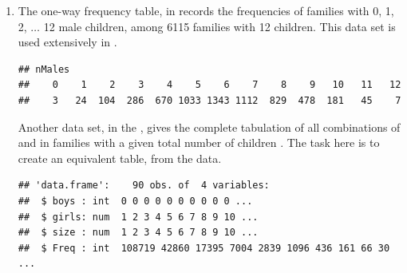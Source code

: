 \documentclass[11pt]{book}
\renewenvironment{knitrout}{\small\renewcommand{\baselinestretch}{.85}}{} %
\begin{document}
\begin{enumerate}
\item The one-way frequency table,  in  records the frequencies
of families with 0, 1, 2, $\dots$ 12 male children, among 6115 families with 12
children.  This data set is used extensively in .
\begin{knitrout}
\color{fgcolor}\begin{kframe}
\begin{alltt}
 \hlstd{=}\hlstd{)}
\end{alltt}
\begin{verbatim}
## nMales
##    0    1    2    3    4    5    6    7    8    9   10   11   12 
##    3   24  104  286  670 1033 1343 1112  829  478  181   45    7
\end{verbatim}
\end{kframe}
\end{knitrout}
Another data set,  in the , gives the complete
tabulation of all combinations of  and  in families with
a given total number of children .  The task here is to create an
equivalent table,  from the  data.
\begin{knitrout}
\color{fgcolor}\begin{kframe}
\begin{alltt}
 \hlstd{=}\hlstd{)}
\end{alltt}
\begin{verbatim}
## 'data.frame':	90 obs. of  4 variables:
##  $ boys : int  0 0 0 0 0 0 0 0 0 0 ...
##  $ girls: num  1 2 3 4 5 6 7 8 9 10 ...
##  $ size : num  1 2 3 4 5 6 7 8 9 10 ...
##  $ Freq : int  108719 42860 17395 7004 2839 1096 436 161 66 30 ...
\end{verbatim}
\end{kframe}
\end{knitrout}


\end{enumerate}
\end{document}
